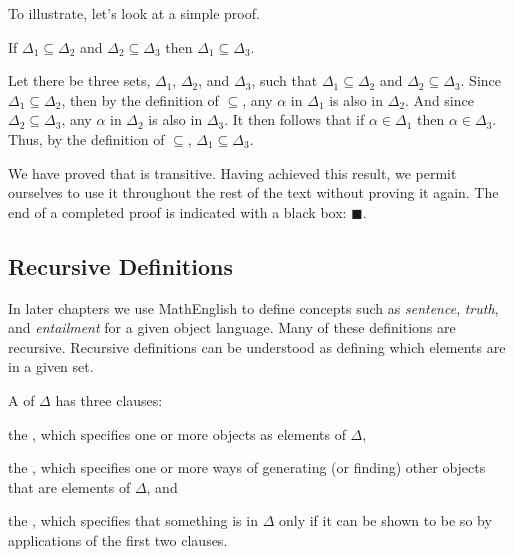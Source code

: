To illustrate, let's look at a simple proof.

\begin{THEOREM}{}
	If $\Delta_1\subseteq\Delta_2$ and $\Delta_2\subseteq\Delta_3$ then $\Delta_1\subseteq\Delta_3$.
\end{THEOREM}
\begin{PROOF}
	Let there be three sets, $\Delta_1$, $\Delta_2$, and $\Delta_3$, such that $\Delta_1\subseteq\Delta_2$ and $\Delta_2\subseteq\Delta_3$.
	Since $\Delta_1\subseteq\Delta_2$, then by the definition of $\subseteq$, any $\alpha$ in $\Delta_1$ is also in $\Delta_2$.
	And since $\Delta_2\subseteq\Delta_3$, any $\alpha$ in $\Delta_2$ is also in $\Delta_3$.
	It then follows that if $\alpha\in\Delta_1$ then $\alpha\in\Delta_3$. 
	Thus, by the definition of $\subseteq$, $\Delta_1\subseteq\Delta_3$.
\end{PROOF}

\noindent{}We have proved that \mention{$\subseteq$} is transitive. 
Having achieved this result, we permit ourselves to use it throughout the rest of the text without proving it again. 
The end of a completed proof is indicated with a black box: $\blacksquare$.

\subsection{Recursive Definitions}\label{Recursive Definitions}

In later chapters we use MathEnglish to define concepts such as \emph{sentence}, \emph{truth}, and \emph{entailment} for a given object language. 
Many of these definitions are recursive. 
Recursive definitions can be understood as defining which elements are in a given set.

\begin{majorILnc}{}
A  of $\Delta$ has three clauses:
\begin{cenumerate}
\item the , which specifies one or more objects as elements of $\Delta$,
\item the , which specifies one or more ways of generating (or finding) other objects that are elements of $\Delta$, and
\item the , which specifies that something is in $\Delta$ only if it can be shown to be so by applications of the first two clauses.
\end{cenumerate}
\end{majorILnc}

